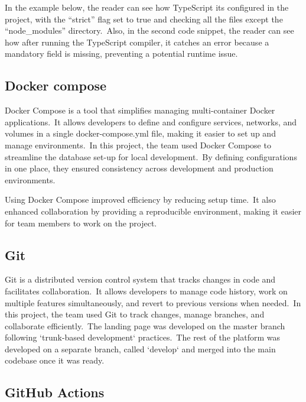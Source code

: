 In the example below, the reader can see how TypeScript its configured in the project, with the ``strict'' flag set to true and checking all the files except the ``node_modules'' directory.\ Also, in the second code snippet, the reader can see how after running the TypeScript compiler, it catches an error because a mandatory field is missing, preventing a potential runtime issue.



\subsection{Docker compose}\label{subsec:docker-compose}

Docker Compose is a tool that simplifies managing multi-container Docker applications.\ It allows developers to define and configure services, networks, and volumes in a single docker-compose.yml file, making it easier to set up and manage environments.\ In this project, the team used Docker Compose to streamline the database set-up for local development.\ By defining configurations in one place, they ensured consistency across development and production environments.\cite[Docker Compose]{dockerCompose}

Using Docker Compose improved efficiency by reducing setup time.\ It also enhanced collaboration by providing a reproducible environment, making it easier for team members to work on the project.

\subsection{Git}\label{subsec:git}

Git is a distributed version control system that tracks changes in code and facilitates collaboration.\ It allows developers to manage code history, work on multiple features simultaneously, and revert to previous versions when needed.\ In this project, the team used Git to track changes, manage branches, and collaborate efficiently.\ The landing page was developed on the master branch following `trunk-based development` practices.\ The rest of the platform was developed on a separate branch, called `develop` and merged into the main codebase once it was ready.\cite[Git]{git}

\subsection{GitHub Actions}\label{subsec:github-actions}


